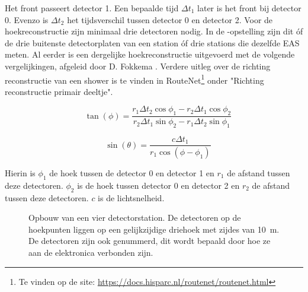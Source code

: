 Het front passeert detector 1. Een bepaalde tijd $\Delta t_1$ later is
het front bij detector 0. Evenzo is $\Delta t_2$ het tijdsverschil tussen detector 0 en detector 2. Voor
de hoekreconstructie zijn minimaal drie detectoren nodig. In de
\hisparc-opstelling zijn dit \'of de drie buitenste detectorplaten van een
station \'of drie stations die dezelfde EAS meten. Al eerder is een
dergelijke hoekreconstructie uitgevoerd met de volgende vergelijkingen,
afgeleid door D. Fokkema \cite{Fokkema}. Verdere uitleg over de richting
reconstructie van een shower is te vinden in
RouteNet\footnote{Te vinden op de site:
\url{https://docs.hisparc.nl/routenet/routenet.html}}
onder "Richting reconstructie primair deeltje".

\begin{equation}
   \quad\tan(\phi) = \frac{r_1\Delta t_2\cos\phi_1-r_2\Delta t_1\cos\phi_2}
                          {r_2\Delta t_1\sin\phi_2-r_1\Delta t_2\sin\phi_1}
\end{equation}

\begin{equation}
    \quad\sin(\theta) = \frac{c\Delta t_1}{r_1\cos(\phi-\phi_1)}
\end{equation}

Hierin is $\phi_1$ de hoek tussen de detector 0 en detector 1 en $r_1$ de
afstand tussen deze detectoren. $\phi_2$ is de hoek tussen detector 0 en
detector 2 en $r_2$ de afstand tussen deze detectoren. $c$ is de
lichtsnelheid.

\begin{figure}
    \centering
    
    \caption{Opbouw van een vier detectorstation. De detectoren op de
             hoekpunten liggen op een gelijkzijdige driehoek met zijdes
             van \SI{10}{\meter}. De detectoren zijn ook genummerd, dit
             wordt bepaald door hoe ze aan de \hisparc elektronica
             verbonden zijn.}
    \label{fig:stationlayout}
\end{figure}

